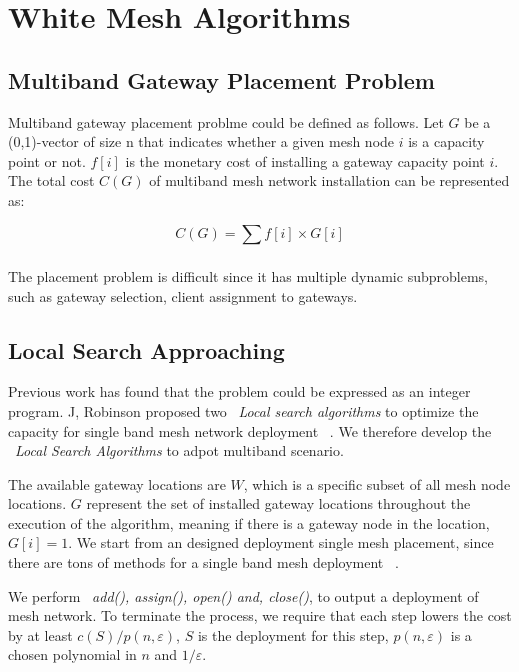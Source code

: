 \section{White Mesh Algorithms}
\label{sec:algorithms}

\subsection{Multiband Gateway Placement Problem}
\label{subsec:placementproblem}

Multiband gateway placement problme could be defined as follows. Let $G$ be a (0,1)-vector of size n that indicates whether a given mesh node $i$ is a capacity point or not. $f[i]$ is the monetary cost of installing a gateway capacity point $i$.
The total cost $C(G)$ of multiband mesh network installation can be represented as:

\begin{equation}
C(G)=\sum_{} f[i] \times G[i]
\end{equation}

The placement problem is difficult since it has multiple dynamic subproblems, such as gateway selection, client assignment to gateways. 

\subsection{Local Search Approaching}
Previous work has found that the problem could be expressed as an integer program. J, Robinson proposed two ~\emph{Local search algorithms} to optimize the capacity for single band mesh network deployment ~\cite{robinson2008adding}.
We therefore develop the ~\emph{Local Search Algorithms} to adpot multiband scenario.


The available gateway locations are $W$, which is a specific subset of all mesh node locations. $G$ represent the set of installed gateway locations throughout the execution of the algorithm, meaning if there is a gateway node in the location, $G[i]=1$.
We start from an designed deployment single mesh placement, since there are tons of methods for a single band mesh deployment ~\cite{akyildiz2005wireless}.

We perform ~\emph{add(), assign(), open() and, close()}, to output a deployment of mesh network. 
To terminate the process, we require that each step lowers the cost by at least $c(S)/p(n,\varepsilon)$, $S$ is the deployment for this step, $p(n,\varepsilon)$ is a chosen polynomial in $n$ and $1/ \varepsilon$.


